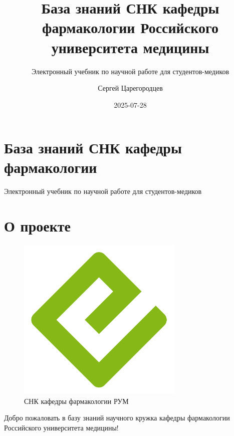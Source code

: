 \documentclass[
  russian,
  letterpaper,
]{book}
\title{База знаний СНК кафедры фармакологии Российского университета
медицины}
\subtitle{Электронный учебник по научной работе для студентов-медиков}
\author{Сергей Царегородцев}
\date{2025-07-28}
\renewcommand*\contentsname{Содержание}
\newcommand\contentsname{Содержание}
\begin{document}
\frontmatter
\maketitle

\renewcommand*\contentsname{Содержание}
{
\setcounter{tocdepth}{2}
\tableofcontents
}

\mainmatter
{}

\chapter{База знаний СНК кафедры
фармакологии}\label{ux431ux430ux437ux430-ux437ux43dux430ux43dux438ux439-ux441ux43dux43a-ux43aux430ux444ux435ux434ux440ux44b-ux444ux430ux440ux43cux430ux43aux43eux43bux43eux433ux438ux438}

Электронный учебник по научной работе для студентов-медиков

\hfill\break


\chapter{О проекте}\label{sec-about}

\begin{figure}[H]

{\centering \includegraphics[width=3.125in,height=\textheight,keepaspectratio]{cover.png}

}

\caption{СНК кафедры фармакологии РУМ}

\end{figure}%

Добро пожаловать в базу знаний научного кружка кафедры фармакологии
Российского университета медицины!
\end{document}

